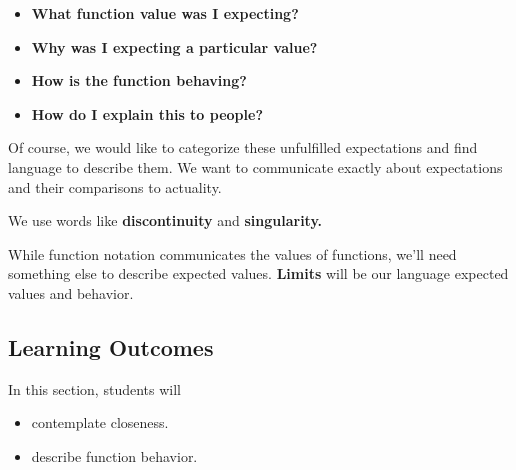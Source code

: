\documentclass{ximera}
\begin{document}
\begin{itemize}
\item  \textbf{\textcolor{blue!75!black}{What function value was I expecting?}}
\item  \textbf{\textcolor{blue!75!black}{Why was I expecting a particular value?}}
\item  \textbf{\textcolor{blue!75!black}{How is the function behaving?}}
\item  \textbf{\textcolor{blue!75!black}{How do I explain this to people?}}
\end{itemize} 












Of course, we would like to categorize these unfulfilled expectations and find language to describe them. We want to communicate exactly about expectations and their comparisons to actuality. 


We use words like \textbf{\textcolor{purple!85!blue}{discontinuity}} and \textbf{\textcolor{purple!85!blue}{singularity.}} 


While function notation communicates the values of functions, we'll need something else to describe expected values. \textbf{\textcolor{purple!85!blue}{Limits}} will be our language expected values and behavior.





\subsection*{Learning Outcomes}


\begin{sectionOutcomes}
In this section, students will 

\begin{itemize}
\item contemplate closeness.
\item describe function behavior.
\end{itemize}
\end{sectionOutcomes}















\end{document}
